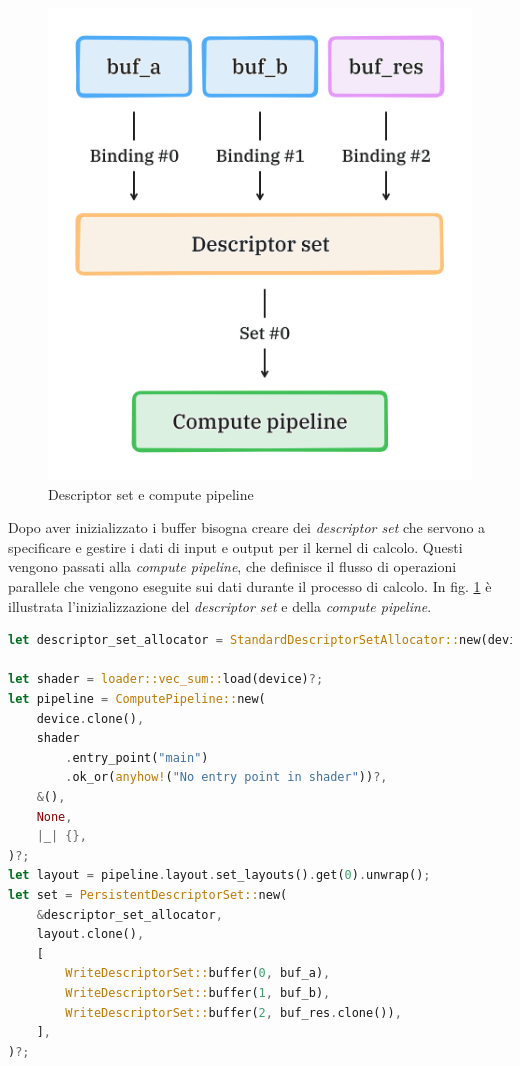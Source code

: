 \begin{figure}[ht]
    \centering
    \includegraphics[width=.5\linewidth]{images/chapter2/pipeline.png}
    \caption{Descriptor set e compute pipeline}
    \label{fig:vulkan_pipeline}
\end{figure}

Dopo aver inizializzato i buffer bisogna creare dei \textit{descriptor set} che servono a specificare e gestire i dati di input e output per il kernel di calcolo. Questi vengono passati alla \textit{compute pipeline}, che definisce il flusso di operazioni parallele che vengono eseguite sui dati durante il processo di calcolo. In  fig. \ref{fig:vulkan_pipeline} è illustrata l'inizializzazione del \textit{descriptor set} e della \textit{compute pipeline}.

\newpage 

\vspace{5mm}
\begin{lstlisting}[language=Rust, caption=Inizializzazione della compute pipeline, label=lis:vulkan_pipeline]
let descriptor_set_allocator = StandardDescriptorSetAllocator::new(device.clone());

let shader = loader::vec_sum::load(device)?;
let pipeline = ComputePipeline::new(
    device.clone(),
    shader
        .entry_point("main")
        .ok_or(anyhow!("No entry point in shader"))?,
    &(),
    None,
    |_| {},
)?;
let layout = pipeline.layout.set_layouts().get(0).unwrap();
let set = PersistentDescriptorSet::new(
    &descriptor_set_allocator,
    layout.clone(),
    [
        WriteDescriptorSet::buffer(0, buf_a),
        WriteDescriptorSet::buffer(1, buf_b),
        WriteDescriptorSet::buffer(2, buf_res.clone()),
    ],
)?;
\end{lstlisting}
\vspace{5mm}

